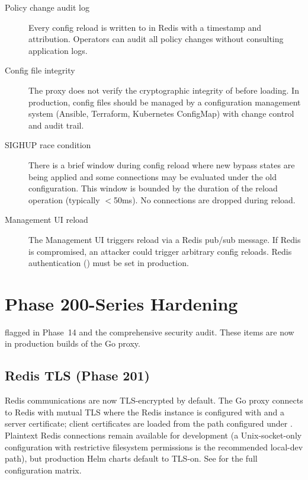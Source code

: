 \begin{description}
  \item[Policy change audit log] Every config reload is written to
     in Redis with a timestamp and attribution.
    Operators can audit all policy changes without consulting application logs.
  \item[Config file integrity] The proxy does not verify the cryptographic integrity
    of  before loading. In production, config files should
    be managed by a configuration management system (Ansible, Terraform, Kubernetes
    ConfigMap) with change control and audit trail.
  \item[SIGHUP race condition] There is a brief window during config reload where
    new bypass states are being applied and some connections may be evaluated under
    the old configuration. This window is bounded by the duration of the reload
    operation (typically $<$50ms). No connections are dropped during reload.
  \item[Management UI reload] The Management UI triggers reload via a Redis pub/sub
    message. If Redis is compromised, an attacker could trigger arbitrary config
    reloads. Redis authentication () must be set in
    production.
\end{description}

\section{Phase 200-Series Hardening}
\label{sec:phase200-hardening}

 flagged
in Phase~14 and the comprehensive security audit. These items are now in
production builds of the Go proxy.

\subsection{Redis TLS (Phase 201)}

Redis communications are now TLS-encrypted by default. The Go proxy connects
to Redis with mutual TLS where the Redis instance is configured with
 and a server certificate; client certificates are loaded from
the path configured under . Plaintext Redis
connections remain available for development (a Unix-socket-only configuration
with restrictive filesystem permissions is the recommended local-dev path), but
production Helm charts default to TLS-on. See 
for the full configuration matrix.


